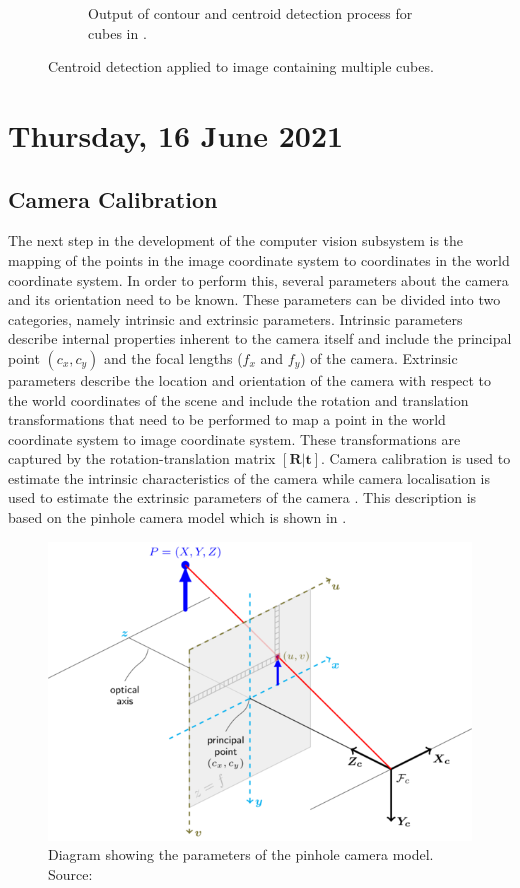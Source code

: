 \begin{figure}[H]
\begin{subfigure}[b]{0.45\textwidth}
         \caption{Output of contour and centroid detection process for cubes in .}
         \label{fig:multiple-cube-centroids}
    \end{subfigure}
    \captionsetup{singlelinecheck = false, justification=justified}
    \caption{Centroid detection applied to image containing multiple cubes.}
    \label{fig:multiple-cube-detection}
\end{figure}

\pendsign

\section[2021/06/16]{Thursday, 16 June 2021}

\subsection{Camera Calibration}

The next step in the development of the computer vision subsystem is the mapping of the points in the image coordinate system to coordinates in the world coordinate system. In order to perform this, several parameters about the camera and its orientation need to be known. These parameters can be divided into two categories, namely intrinsic and extrinsic parameters. Intrinsic parameters describe internal properties inherent to the camera itself and include the principal point $(c_x,c_y)$ and the focal lengths ($f_x$ and $f_y$) of the camera. Extrinsic parameters describe the location and orientation of the camera with respect to the world coordinates of the scene and include the rotation and translation transformations that need to be performed to map a point in the world coordinate system to image coordinate system. These transformations are captured by the rotation-translation matrix $[\textbf{R}|\textbf{t}]$. Camera calibration is used to estimate the intrinsic characteristics of the camera while camera localisation is used to estimate the extrinsic parameters of the camera \cite{Szeliski2010}. This description is based on the pinhole camera model which is shown in .

\begin{figure}[!ht]
    \centering
    \includegraphics[width=0.7\linewidth]{figures/202106/pinhole-camera-model.png}
    \caption{Diagram showing the parameters of the pinhole camera model. Source: \cite{OpenCVCameraCalibration}}
    \label{fig:pinhole-camera-model}
\end{figure}

